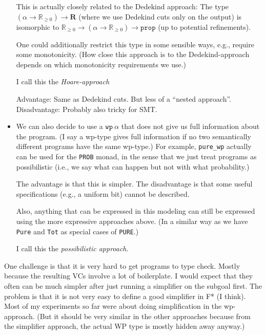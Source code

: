 \documentclass[a4paper]{article}
\newcommand\setR{\mathbb R}
\newcommand\Rpos{\setR_{\geq0}}
\newcommand\prop{\mathtt{prop}}
\begin{document}
\begin{itemize}
  This is actually closely related to the Dedekind approach: The type
  $(\alpha\to\Rpos)\to \mathbf{R}$ (where we use Dedekind cuts only on
  the output) is isomorphic to $\Rpos\to(\alpha\to\Rpos)\to\prop$ (up
  to potential refinements).

  One could additionally restrict this type in some sensible ways, e.g., require some monotonicity.
  (How close this approach is to the Dedekind-approach depends on which monotonicity requirements we use.)

  I call this the \emph{Hoare-approach}
  
  Advantage: Same as Dedekind cuts. But less of a ``nested approach''.
  Disadvantage: Probably also tricky for SMT.
\item We can also decide to use a $\mathtt{wp}\ \alpha$ that does not
  give us full information about the program. (I say a wp-type gives
  full information if no two semantically different programs have the
  same wp-type.) For example, \texttt{pure\_wp} actually can be used
  for the \texttt{PROB} monad, in the sense that we just treat
  programs as possibilistic (i.e., we say what can happen but not with
  what probability.)

  The advantage is that this is simpler. The disadvantage is that some
  useful specifications (e.g., a uniform bit) cannot be described.

  Also, anything that can be expressed in this modeling can still be
  expressed using the more expressive approaches above. (In a similar
  way as we have \texttt{Pure} and \texttt{Tot} as special cases of
  \texttt{PURE}.)

  I call this the \emph{possibilistic approach}.
\end{itemize}

One challenge is that it is very hard to get programs to type
check. Mostly because the resulting VCs involve a lot of
boilerplate. I would expect that they often can be much simpler after
just running a simplifier on the subgoal first. The problem is that it
is not very easy to define a good simplifier in F* (I think). Most of
my experiments so far were about doing simplification in the
wp-approach. (But it should be very similar in the other approaches
because from the simplifier approach, the actual WP type is mostly
hidden away anyway.)
\end{document}
